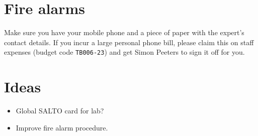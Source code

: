\documentclass[12pt, a4paper]{article}
\begin{document}
\section{Fire alarms}
Make sure you have your mobile phone and a piece of paper with the expert's contact details. If you incur a large personal phone bill, please claim this on staff expenses (budget code {\tt TB006-23}) and get Simon Peeters to sign it off for you.

\section{Ideas}
\begin{itemize}
	\item Global SALTO card for lab?
	\item Improve fire alarm procedure.
\end{itemize}

\end{document}
